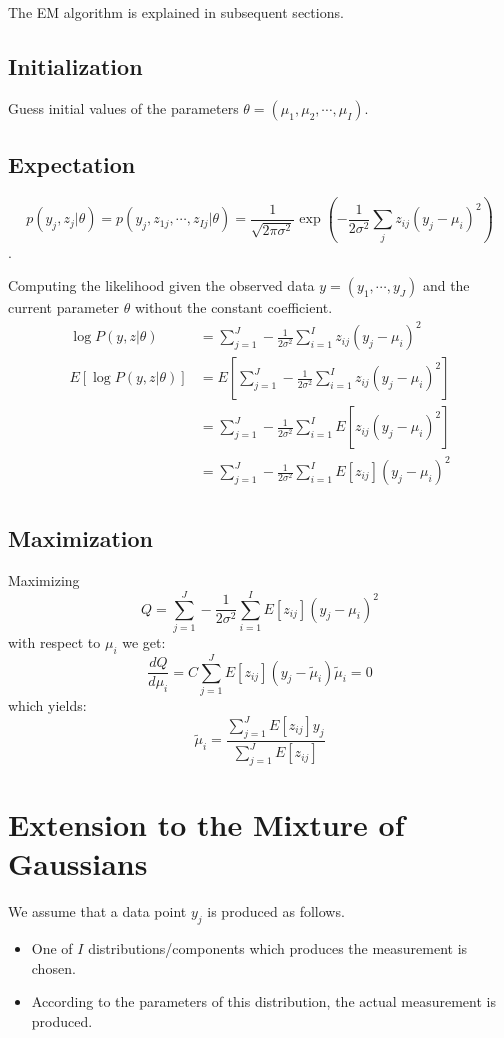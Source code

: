 \documentclass{article}  %
\begin{document}
The EM algorithm is explained in subsequent sections.
\subsection{Initialization}
Guess initial values of the parameters $\theta = (\mu_1, \mu_2, \cdots,
\mu_I)$.

\subsection{Expectation}

\[
p(y_j,z_j|\theta) = p(y_j, z_{1j},\cdots, z_{Ij}|\theta) = \frac{1}{\sqrt
{2\pi\sigma^2}}\exp\left( -\frac{1}{2\sigma^2}\sum_j z_{ij}(y_j-\mu_i)^2\right) \].

Computing the likelihood given the observed data $y=(y_1,\cdots,y_J)$ and the
current parameter $\theta$ without the constant coefficient.
\begin{align*}
\log P(y,z|\theta) &= \sum_{j=1}^J -\frac{1}{2\sigma^2}\sum_{i=1}^I
z_{ij}(y_j-\mu_i)^2\\
E[\log P(y,z|\theta)] &= E\left [\sum_{j=1}^J -\frac{1}{2\sigma^2}\sum_{i=1}^I
z_{ij}(y_j-\mu_i)^2 \right]\\
&= \sum_{j=1}^J -\frac{1}{2\sigma^2}\sum_{i=1}^I
E\left[z_{ij}(y_j-\mu_i)^2\right]\\
&= \sum_{j=1}^J -\frac{1}{2\sigma^2}\sum_{i=1}^I E[z_{ij}](y_j-\mu_i)^2\\
\end{align*}

\subsection{Maximization}
Maximizing 
\[
Q = \sum_{j=1}^J -\frac{1}{2\sigma^2}\sum_{i=1}^I E[z_{ij}](y_j-\mu_i)^2
\]
with respect  to $\mu_i$ we get:
\[
\frac{dQ}{d\mu_i} = C\sum_{j=1}^J E[z_{ij}](y_j-\tilde \mu_i)\tilde \mu_i = 0
\]
which yields:
\[
\tilde \mu_i = \frac{\sum_{j=1}^J E[z_{ij}]y_j}{\sum_{j=1}^J E[z_{ij}]}
\]

\section{Extension to the Mixture of Gaussians}
We assume that a data point $y_j$ is produced as follows.
\begin{itemize}
  \item One of $I$ distributions/components which produces the measurement is
  chosen.
  \item According to the parameters of this distribution, the actual measurement
  is produced. 
\end{itemize}
\end{document}
